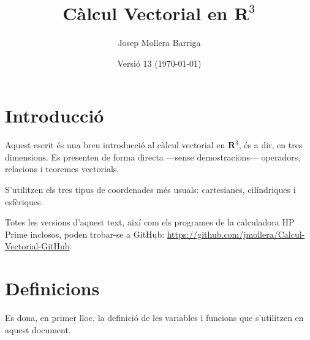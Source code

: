 \documentclass[catalan,a4paper,twoside,11pt]{article}
\begin{document}
\title{Càlcul Vectorial en $\boldsymbol{R}^3$}
\author{Josep Mollera Barriga}
\date{Versió 13 (\today)}
\maketitle


\section{Introducció}

Aquest escrit és una breu introducció al càlcul vectorial en $\boldsymbol{R}^3$, és a dir, en tres dimensions. Es presenten de forma directa ---sense demostracions--- operadors, relacions i teoremes vectorials.

S'utilitzen els tres tipus de coordenades més usuals:  cartesianes, 
cilíndriques i esfèriques.

Totes les versions d'aquest text, així com els programes de la calculadora \textsf{HP Prime} inclosos, poden trobar-se a GitHub: \href{https://github.com/jmollera/Calcul-Vectorial-GitHub}{https://github.com/jmollera/Calcul-Vectorial-GitHub}.


\section{Definicions}

Es dona, en primer lloc, la definició de les variables i funcions que s'utilitzen en aquest document.
\end{document}
